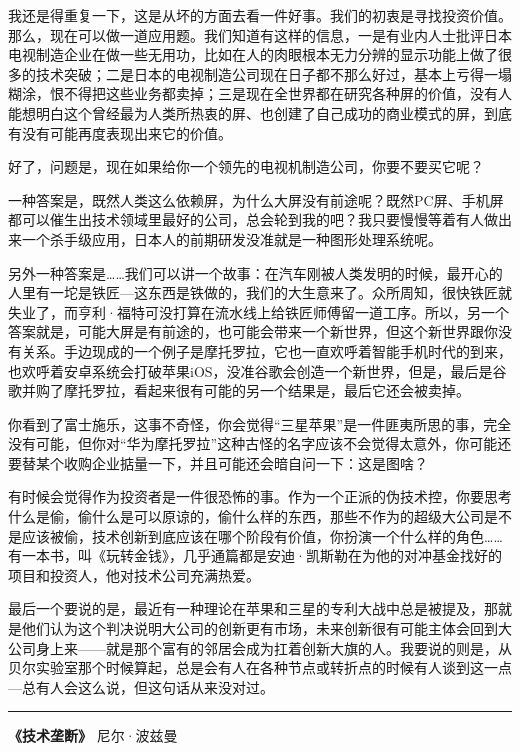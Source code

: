 我还是得重复一下，这是从坏的方面去看一件好事。我们的初衷是寻找投资价值。那么，现在可以做一道应用题。我们知道有这样的信息，一是有业内人士批评日本电视制造企业在做一些无用功，比如在人的肉眼根本无力分辨的显示功能上做了很多的技术突破；二是日本的电视制造公司现在日子都不那么好过，基本上亏得一塌糊涂，恨不得把这些业务都卖掉；三是现在全世界都在研究各种屏的价值，没有人能想明白这个曾经最为人类所热衷的屏、也创建了自己成功的商业模式的屏，到底有没有可能再度表现出来它的价值。

好了，问题是，现在如果给你一个领先的电视机制造公司，你要不要买它呢？

一种答案是，既然人类这么依赖屏，为什么大屏没有前途呢？既然PC屏、手机屏都可以催生出技术领域里最好的公司，总会轮到我的吧？我只要慢慢等着有人做出来一个杀手级应用，日本人的前期研发没准就是一种图形处理系统呢。

另外一种答案是\ldots\ldots 我们可以讲一个故事：在汽车刚被人类发明的时候，最开心的人里有一坨是铁匠---这东西是铁做的，我们的大生意来了。众所周知，很快铁匠就失业了，而亨利·福特可没打算在流水线上给铁匠师傅留一道工序。所以，另一个答案就是，可能大屏是有前途的，也可能会带来一个新世界，但这个新世界跟你没有关系。手边现成的一个例子是摩托罗拉，它也一直欢呼着智能手机时代的到来，也欢呼着安卓系统会打破苹果iOS，没准谷歌会创造一个新世界，但是，最后是谷歌并购了摩托罗拉，看起来很有可能的另一个结果是，最后它还会被卖掉。

你看到了富士施乐，这事不奇怪，你会觉得``三星苹果''是一件匪夷所思的事，完全没有可能，但你对``华为摩托罗拉''这种古怪的名字应该不会觉得太意外，你可能还要替某个收购企业掂量一下，并且可能还会暗自问一下：这是图啥？

有时候会觉得作为投资者是一件很恐怖的事。作为一个正派的伪技术控，你要思考什么是偷，偷什么是可以原谅的，偷什么样的东西，那些不作为的超级大公司是不是应该被偷，技术创新到底应该在哪个阶段有价值，你扮演一个什么样的角色\ldots\ldots 有一本书，叫《玩转金钱》，几乎通篇都是安迪·凯斯勒在为他的对冲基金找好的项目和投资人，他对技术公司充满热爱。

最后一个要说的是，最近有一种理论在苹果和三星的专利大战中总是被提及，那就是他们认为这个判决说明大公司的创新更有市场，未来创新很有可能主体会回到大公司身上来------就是那个富有的邻居会成为扛着创新大旗的人。我要说的则是，从贝尔实验室那个时候算起，总是会有人在各种节点或转折点的时候有人谈到这一点---总有人会这么说，但这句话从来没对过。

\begin{center}\rule{0.5\linewidth}{0.5pt}\end{center}

\textbf{《技术垄断》} 尼尔·波兹曼

